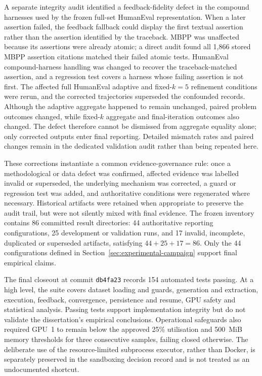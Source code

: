 A separate integrity audit identified a feedback-fidelity defect in the compound harnesses used by the frozen full-set HumanEval representation. When a later assertion failed, the feedback fallback could display the first textual assertion rather than the assertion identified by the traceback. MBPP was unaffected because its assertions were already atomic; a direct audit found all 1,866 stored MBPP assertion citations matched their failed atomic tests. HumanEval compound-harness handling was changed to recover the traceback-matched assertion, and a regression test covers a harness whose failing assertion is not first. The affected full HumanEval adaptive and fixed-$k=5$ refinement conditions were rerun, and the corrected trajectories superseded the confounded records. Although the adaptive aggregate happened to remain unchanged, paired problem outcomes changed, while fixed-$k$ aggregate and final-iteration outcomes also changed. The defect therefore cannot be dismissed from aggregate equality alone; only corrected outputs enter final reporting. Detailed mismatch rates and paired changes remain in the dedicated validation audit rather than being repeated here.

These corrections instantiate a common evidence-governance rule: once a methodological or data defect was confirmed, affected evidence was labelled invalid or superseded, the underlying mechanism was corrected, a guard or regression test was added, and authoritative conditions were regenerated where necessary. Historical artifacts were retained when appropriate to preserve the audit trail, but were not silently mixed with final evidence. The frozen inventory contains 86 committed result directories: 44 authoritative reporting configurations, 25 development or validation runs, and 17 invalid, incomplete, duplicated or superseded artifacts, satisfying $44+25+17=86$. Only the 44 configurations defined in Section~\ref{sec:experimental-campaign} support final empirical claims.

The final closeout at commit \texttt{db4fa23} records 154 automated tests passing. At a high level, the suite covers dataset loading and guards, generation and extraction, execution, feedback, convergence, persistence and resume, GPU safety and statistical analysis. Passing tests support implementation integrity but do not validate the dissertation's empirical conclusions. Operational safeguards also required GPU~1 to remain below the approved 25\% utilisation and 500~MiB memory thresholds for three consecutive samples, failing closed otherwise. The deliberate use of the resource-limited subprocess executor, rather than Docker, is separately preserved in the sandboxing decision record and is not treated as an undocumented shortcut.

